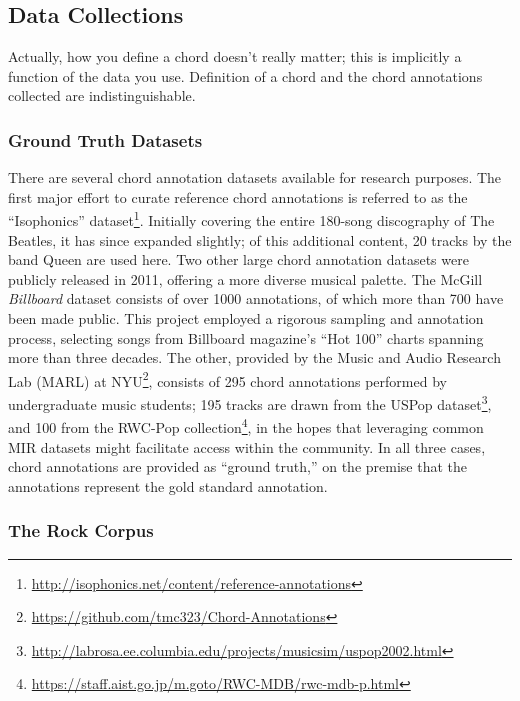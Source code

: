 \documentclass{article}
\begin{document}
\subsection{Data Collections}\label{subsec:data}

Actually, how you define a chord doesn't really matter; this is implicitly a function of the data you use.
Definition of a chord and the chord annotations collected are indistinguishable.

\subsubsection{Ground Truth Datasets}

There are several chord annotation datasets available for research purposes.
The first major effort to curate reference chord annotations is referred to as the ``Isophonics'' dataset\footnote{\url{http://isophonics.net/content/reference-annotations}}.
Initially covering the entire 180-song discography of The Beatles, it has since expanded slightly;
of this additional content, 20 tracks by the band Queen are used here.
Two other large chord annotation datasets were publicly released in 2011, offering a more diverse musical palette.
The McGill \emph{Billboard} dataset consists of over 1000 annotations, of which more than 700 have been made public.
This project employed a rigorous sampling and annotation process, selecting songs from Billboard magazine's ``Hot 100'' charts spanning more than three decades.
The other, provided by the Music and Audio Research Lab (MARL) at NYU\footnote{\url{https://github.com/tmc323/Chord-Annotations}}, consists of 295 chord annotations performed by undergraduate music students;
195 tracks are drawn from the USPop dataset\footnote{\url{http://labrosa.ee.columbia.edu/projects/musicsim/uspop2002.html}}, and 100 from the RWC-Pop collection\footnote{\url{https://staff.aist.go.jp/m.goto/RWC-MDB/rwc-mdb-p.html}}, in the hopes that leveraging common MIR datasets might facilitate access within the community.
In all three cases, chord annotations are provided as ``ground truth,'' on the premise that the annotations represent the gold standard annotation.


\subsubsection{The Rock Corpus}
\end{document}
